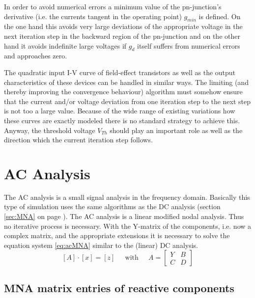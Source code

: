 \documentclass[10pt]{report}
\begin{document}
In order to avoid numerical errors a minimum value of the
pn-junction's derivative (i.e. the currents tangent in the operating
point) $g_{min}$ is defined.  On the one hand this avoids very large
deviations of the appropriate voltage in the next iteration step in
the backward region of the pn-junction and on the other hand it avoids
indefinite large voltages if $g_d$ itself suffers from numerical
errors and approaches zero.

\addvspace{12pt}

The quadratic input I-V curve of field-effect transistors as well as
the output characteristics of these devices can be handled in similar
ways.  The limiting (and thereby improving the convergence behaviour)
algorithm must somehow ensure that the current and/or voltage
deviation from one iteration step to the next step is not too a large
value.  Because of the wide range of existing variations how these
curves are exactly modeled there is no standard strategy to achieve
this.  Anyway, the threshold voltage $V_{Th}$ should play an important
role as well as the direction which the current iteration step
follows.

\chapter{AC Analysis}

The AC analysis is a small signal analysis in the frequency domain.
Basically this type of simulation uses the same algorithms as the DC
analysis (section \ref{sec:MNA} on page \pageref{sec:MNA}).  The AC
analysis is a linear modified nodal analysis.  Thus no iterative
process is necessary.  With the Y-matrix of the components, i.e. now a
complex matrix, and the appropriate extensions it is necessary to
solve the equation system \eqref{eq:acMNA} similar to the (linear) DC
analysis.
\begin{equation}
\label{eq:acMNA}
\left[A\right] \cdot \left[x\right] = \left[z\right]
\;\;\;\; \textrm{ with } \;\;\;\;
A =
\begin{bmatrix}
Y & B\\
C & D
\end{bmatrix}
\end{equation}

\section{MNA matrix entries of reactive components}
\end{document}

